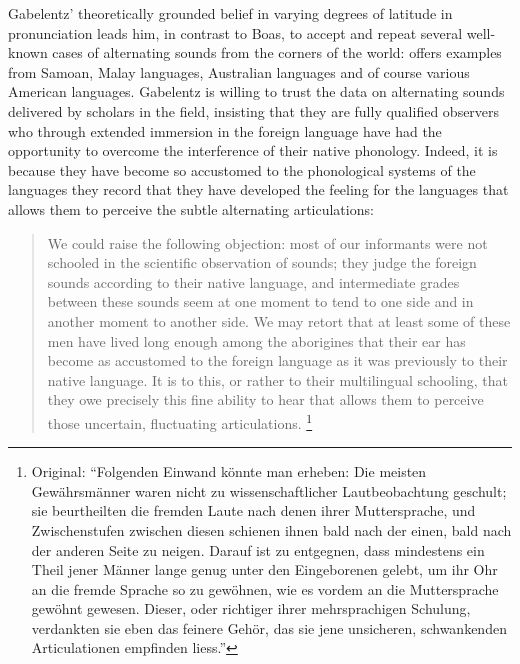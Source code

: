 \documentclass[output=paper]{langscibook}
\begin{document}
Gabelentz' theoretically grounded belief in varying degrees of latitude in pronunciation leads him, in contrast to Boas, to accept and repeat several well-known cases of alternating sounds from the corners of the world: \citet[202--204]{Gabelentz20161891} offers examples from Samoan, Malay languages, Australian languages and of course various American languages. Gabelentz is willing to trust the data on alternating sounds delivered by scholars in the field, insisting that they are fully qualified observers who through extended immersion in the foreign language have had the opportunity to overcome the interference of their native phonology. Indeed, it is because they have become so accustomed to the phonological systems of the languages they record that they have developed the feeling for the languages that allows them to perceive the subtle alternating articulations:

\begin{quotation}
We could raise the following objection: most of our informants were not schooled in the scientific observation of sounds; they judge the foreign sounds according to their native language, and intermediate grades between these sounds seem at one moment to tend to one side and in another moment to another side. We may retort that at least some of these men have lived long enough among the aborigines that their ear has become as accustomed to the foreign language as it was previously to their native language. It is to this, or rather to their multilingual schooling, that they owe precisely this fine ability to hear that allows them to perceive those uncertain, fluctuating articulations. \citep[204--205]{Gabelentz20161891}\footnote{Original: ``Folgenden Einwand könnte man erheben: Die meisten Gewährsmänner waren nicht zu wissenschaftlicher Lautbeobachtung geschult; sie beurtheilten die fremden Laute nach denen ihrer Muttersprache, und Zwischenstufen zwischen diesen schienen ihnen bald nach der einen, bald nach der anderen Seite zu neigen. Darauf ist zu entgegnen, dass mindestens ein Theil jener Männer lange genug unter den Eingeborenen gelebt, um ihr Ohr an die fremde Sprache so zu gewöhnen, wie es vordem an die Muttersprache gewöhnt gewesen. Dieser, oder richtiger ihrer mehrsprachigen Schulung, verdankten sie eben das feinere Gehör, das sie jene unsicheren, schwankenden Articulationen empfinden liess.''}
\end{quotation}
\end{document}
